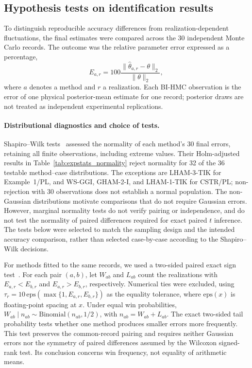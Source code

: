\subsection{Hypothesis tests on identification results}
\label{subsec:experimental_hypothesis_tests}
To distinguish reproducible accuracy differences from realization-dependent
fluctuations, the final estimates were compared across the 30 independent
Monte Carlo records. The outcome was the relative parameter error expressed
as a percentage,
\begin{equation}
 E_{a,r}=100\frac{\|\hat\theta_{a,r}-\theta\|_2}{\|\theta\|_2},
 \label{eq:experimental_test_error}
\end{equation}
where $a$ denotes a method and $r$ a realization. Each BI-HMC observation is
the error of one physical posterior-mean estimate for one record; posterior
draws are not treated as independent experimental replications.

\paragraph{Distributional diagnostics and choice of tests.}
Shapiro--Wilk tests~\cite{ShapiroWilk1965} assessed the normality of each
method's 30 final errors, retaining all finite observations, including
extreme values. Their Holm-adjusted results in
Table~\ref{tab:expstats_normality} reject normality for 32 of the 36 testable
method--case distributions. The exceptions are LHAM-3-TIK for Example~1/PL,
and WS-GGI, GHAM-2-I, and LHAM-1-TIK for CSTR/PL; non-rejection with 30
observations does not establish a normal population. The non-Gaussian
distributions motivate comparisons that do not require Gaussian errors.
However, marginal normality tests do not verify pairing or independence,
and do not test the normality of paired differences required for exact
paired $t$ inference. The tests below were selected to match the sampling
design and the intended accuracy comparison, rather than selected
case-by-case according to the Shapiro--Wilk decisions.

For methods fitted to the same records, we used a two-sided paired exact
sign test~\cite{DixonMood1946}. For each pair $(a,b)$, let $W_{ab}$ and
$L_{ab}$ count the realizations with $E_{a,r}<E_{b,r}$ and
$E_{a,r}>E_{b,r}$, respectively. Numerical ties were excluded, using
$\tau_r=10\,\mathrm{eps}(\max\{1,E_{a,r},E_{b,r}\})$ as the equality
tolerance, where $\mathrm{eps}(x)$ is floating-point spacing at $x$.
Under equal win probabilities,
$W_{ab}\mid n_{ab}\sim\mathrm{Binomial}(n_{ab},1/2)$, with
$n_{ab}=W_{ab}+L_{ab}$. The exact two-sided tail probability tests whether
one method produces smaller errors more frequently. This test preserves
the common-record pairing and requires neither Gaussian errors nor the
symmetry of paired differences assumed by the Wilcoxon signed-rank test.
Its conclusion concerns win frequency, not equality of arithmetic means.

